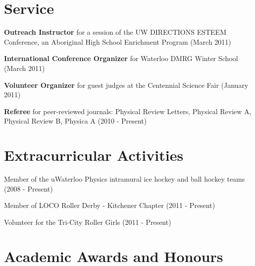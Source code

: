 \documentclass[letterpaper]{article}
\renewenvironment{itemize}{
  \begin{list}{}{
    \setlength{\leftmargin}{1.5em}
  }
}{
  \end{list}
}
\begin{document}
\section*{Service}

\begin{itemize}

\item {\bf Outreach Instructor} for a session of the UW DIRECTIONS ESTEEM Conference, an Aboriginal High School Enrichment Program (March 2011)
\item {\bf International Conference Organizer} for Waterloo DMRG Winter School (March 2011)
\item {\bf Volunteer Organizer} for guest judges at the Centennial Science Fair (January 2011)
\item {\bf Referee} for peer-reviewed journals: Physical Review Letters, Physical Review A, Physical Review B, Physica A (2010 - Present)
\end{itemize}

\section*{Extracurricular Activities}

\begin{itemize}
\item Member of the uWaterloo Physics intramural ice hockey and ball hockey teams (2008 - Present)
\item Member of LOCO Roller Derby - Kitchener Chapter (2011 - Present)
\item Volunteer for the Tri-City Roller Girls (2011 - Present)
\end{itemize}

\section*{Academic Awards and Honours}
\end{document}
